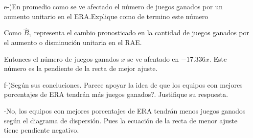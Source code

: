 \documentclass{article}
\begin{document}
		\begin{flushleft}
			e-)En promedio como se ve afectado el n\'umero de juegos ganados por un aumento unitario en el ERA.Explique como de termino este n\'umero 
		\end{flushleft}

		\begin{flushleft}
			Como $\hat B_{1}$ representa el cambio pronosticado en la cantidad de juegos ganados por el aumento o disminuci\'on unitaria en el RAE.
		\end{flushleft}

		\begin{flushleft}
			Entonces el n\'umero de juegos ganados $x$ se ve afentado en $-17.336 x$. Este n\'umero es la pendiente de la recta de mejor ajuste.
		\end{flushleft}

		\begin{flushleft}
			f-)Seg\'un sus concluciones. \textquestiondown Parece apoyar la idea de que los equipos con mejores porcentajes de ERA tendr\'an m\'as juegos ganados?. Justifique su respuesta. 
		\end{flushleft}

		\begin{flushleft}
			-No, los equipos con mejores porcentajes de ERA tendr\'an menos juegos ganados seg\'un el diagrama de dispersi\'on. Pues la ecuaci\'on de la recta de menor ajuste tiene pendiente negativo.
		\end{flushleft}
\end{document}
